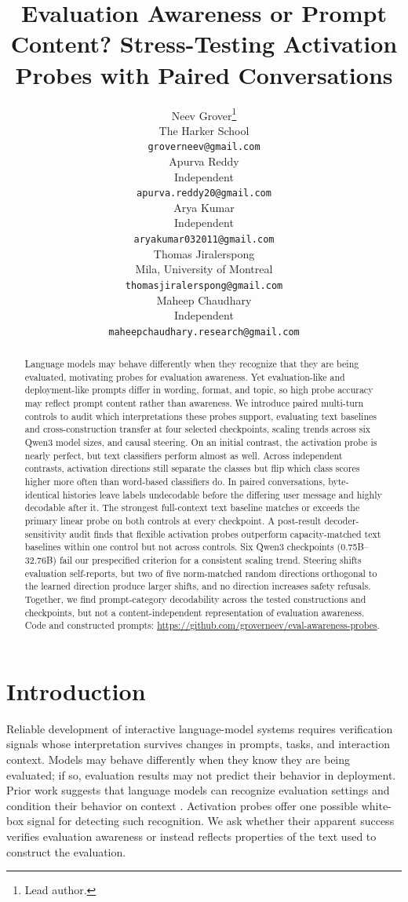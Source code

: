 \documentclass{article}
\title{Evaluation Awareness or Prompt Content? Stress-Testing Activation Probes with Paired Conversations}
\author{%
  Neev Grover\thanks{Lead author.} \\
  The Harker School \\
  \texttt{groverneev@gmail.com} \\
  \And
  Apurva Reddy \\
  Independent \\
  \texttt{apurva.reddy20@gmail.com} \\
  \And
  Arya Kumar \\
  Independent \\
  \texttt{aryakumar032011@gmail.com} \\
  \AND
  Thomas Jiralerspong \\
  Mila, University of Montreal \\
  \texttt{thomasjiralerspong@gmail.com} \\
  \And
  Maheep Chaudhary \\
  Independent \\
  \texttt{maheepchaudhary.research@gmail.com} \\
}
\begin{document}
\maketitle

\begin{abstract}
Language models may behave differently when they recognize that they are being
evaluated, motivating probes for evaluation awareness. Yet evaluation-like and
deployment-like prompts differ in wording, format, and topic, so high
probe accuracy may reflect prompt content rather than awareness. We introduce
paired multi-turn controls to audit which interpretations these probes support,
evaluating text baselines and cross-construction transfer at four selected
checkpoints, scaling trends across six Qwen3 model sizes, and causal steering. On an initial
contrast, the activation probe is nearly perfect, but text classifiers perform
almost as well. Across independent contrasts, activation
directions still separate the classes but flip which class scores higher more
often than word-based classifiers do. In paired conversations, byte-identical histories leave
labels undecodable before the differing user message and highly decodable after
it. The strongest full-context text baseline matches or
exceeds the primary linear probe on both controls at every checkpoint. A
post-result decoder-sensitivity audit finds that flexible activation probes
outperform capacity-matched text baselines within one control but not across
controls. Six Qwen3 checkpoints
(0.75B--32.76B) fail our prespecified criterion for a consistent scaling trend.
Steering shifts evaluation self-reports, but two of five norm-matched random
directions orthogonal to the learned direction produce larger shifts, and no
direction increases safety refusals. Together, we find prompt-category
decodability across the tested constructions and checkpoints, but not a
content-independent representation of evaluation awareness. Code and
constructed prompts: \url{https://github.com/groverneev/eval-awareness-probes}.
\end{abstract}

\section{Introduction}

Reliable development of interactive language-model systems requires
verification signals whose interpretation survives changes in prompts, tasks,
and interaction context. Models may behave differently when they know they are
being evaluated; if so, evaluation results may not predict their behavior in
deployment. Prior work suggests that language models can recognize evaluation
settings and condition their behavior on context
\citep{laine2024sad,needham2025know,greenblatt2024alignment}. Activation probes
offer one possible white-box signal for detecting such recognition. We ask
whether their apparent success verifies evaluation awareness or instead
reflects properties of the text used to construct the evaluation.
\end{document}
